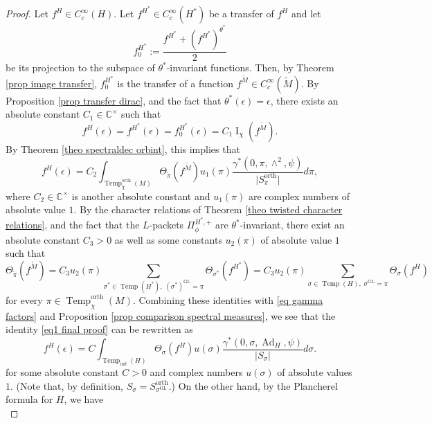 \documentclass[12pt]{article}
\numberwithin{equation}{section}
\def\tM{\widetilde{M}}
\def\bC{\mathbb{C}}
\DeclareMathOperator{\orth}{orth}
\DeclareMathOperator{\Temp}{Temp}
\DeclareMathOperator{\Ad}{Ad}
\DeclareMathOperator{\ind}{ind}
\DeclareMathOperator{\GL}{\mathrm{GL}}
\DeclareMathOperator{\rI}{\mathrm{I}}
\begin{document}
	\begin{proof}
		Let $f^H\in C_c^\infty(H)$. Let $f^{H^*}\in C_c^\infty(H^*)$ be a transfer of $f^H$ and let
		$$f_0^{H^*}:=\frac{f^{H^*}+(f^{H^*})^{\theta^*}}{2}$$
		be its projection to the subspace of $\theta^*$-invariant functions. Then, by Theorem \ref{prop image transfer}, $f_0^{H^*}$ is the transfer of a function $f^{\tM}\in C_c^\infty(\tM)$. By Proposition \ref{prop transfer dirac}, and the fact that $\theta^*(\epsilon)=\epsilon$, there exists an absolute constant $C_1\in \mathbb{C}^\times$ such that
		\begin{equation*}
			\displaystyle f^H(\epsilon)=f^{H^*}(\epsilon)=f_0^{H^*}(\epsilon)=C_1 \rI_{\chi}(f^{\tM}).
		\end{equation*}
		By Theorem \ref{theo spectraldec orbint}, this implies that
\begin{equation}\label{eq1 final proof}
			\displaystyle f^H(\epsilon)=C_2\int_{\Temp_\chi^{\orth}(M)} \Theta_{\widetilde{\pi}}(f^{\tM}) u_1(\pi) \frac{\gamma^*(0,\pi,\wedge^2,\psi)}{\lvert S_\pi^{\orth}\rvert} d\pi,
\end{equation}
	where $C_2\in \bC^\times$ is another absolute constant and $u_1(\pi)$ are complex numbers of absolute value $1$. By the character relations of Theorem \ref{theo twisted character relations}, and the fact that the $L$-packets $\Pi^{H^*,+}_\phi$ are $\theta^*$-invariant, there exist an absolute constant $C_3>0$ as well as some constants $u_2(\pi)$ of absolute value $1$ such that
	\begin{equation*}
	\displaystyle \Theta_{\widetilde{\pi}}(f^{\tM})=C_3u_2(\pi)\sum_{\sigma^*\in \Temp(H^*),\; (\sigma^*)^{\GL}=\pi} \Theta_{\sigma^*}(f^{H^*})=C_3u_2(\pi)\sum_{\sigma\in \Temp(H), \; \sigma^{\GL}=\pi} \Theta_\sigma(f^H)
	\end{equation*} 
for every $\pi\in \Temp^{\orth}_\chi(M)$. Combining these identities with \eqref{eq gamma factors} and Proposition \ref{prop comparison spectral measures}, we see that the identity \eqref{eq1 final proof} can be rewritten as
	\begin{equation}\label{eq2 final proof}
	\displaystyle f^H(\epsilon)=C\int_{\Temp_{\ind}(H)} \Theta_{\sigma}(f^{H}) u(\sigma) \frac{\gamma^*(0,\sigma, \Ad_H,\psi)}{\lvert S_\sigma\rvert} d\sigma.
	\end{equation}
for some absolute constant $C>0$ and complex numbers $u(\sigma)$ of absolute values $1$. (Note that, by definition, $S_\sigma=S^{\orth}_{\sigma^{\GL}}$.) On the other hand, by the Plancherel formula for $H$, we have
\begin{equation}\label{eq3 final proof}

\end{equation}
\end{proof}
\end{document}
